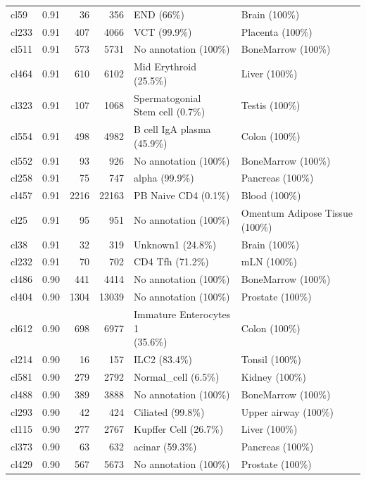 \begin{table}[ht!]
\begin{tabular}{lrrrll}
  cl59 & 0.91 &  36 & 356 & END (66\%) & Brain (100\%) \\ 
  cl233 & 0.91 & 407 & 4066 & VCT (99.9\%) & Placenta (100\%) \\ 
  cl511 & 0.91 & 573 & 5731 & No annotation (100\%) & BoneMarrow (100\%) \\ 
  cl464 & 0.91 & 610 & 6102 & Mid Erythroid (25.5\%) & Liver (100\%) \\ 
  cl323 & 0.91 & 107 & 1068 & \specialcell[t]{Spermatogonial\\Stem cell (0.7\%)} & Testis (100\%) \\ 
  cl554 & 0.91 & 498 & 4982 & B cell IgA plasma (45.9\%) & Colon (100\%) \\ 
  cl552 & 0.91 &  93 & 926 & No annotation (100\%) & BoneMarrow (100\%) \\ 
  cl258 & 0.91 &  75 & 747 & alpha (99.9\%) & Pancreas (100\%) \\ 
  cl457 & 0.91 & 2216 & 22163 & PB Naive CD4  (0.1\%) & Blood (100\%) \\ 
  cl25 & 0.91 &  95 & 951 & No annotation (100\%) & Omentum Adipose Tissue (100\%) \\ 
  cl38 & 0.91 &  32 & 319 & Unknown1 (24.8\%) & Brain (100\%) \\ 
  cl232 & 0.91 &  70 & 702 & CD4 Tfh (71.2\%) & mLN (100\%) \\ 
  cl486 & 0.90 & 441 & 4414 & No annotation (100\%) & BoneMarrow (100\%) \\ 
  cl404 & 0.90 & 1304 & 13039 & No annotation (100\%) & Prostate (100\%) \\ 
  cl612 & 0.90 & 698 & 6977 & \specialcell[t]{Immature Enterocytes 1\\(35.6\%)} & Colon (100\%) \\ 
  cl214 & 0.90 &  16 & 157 & ILC2 (83.4\%) & Tonsil (100\%) \\ 
  cl581 & 0.90 & 279 & 2792 & Normal\_cell (6.5\%) & Kidney (100\%) \\ 
  cl488 & 0.90 & 389 & 3888 & No annotation (100\%) & BoneMarrow (100\%) \\ 
  cl293 & 0.90 &  42 & 424 & Ciliated (99.8\%) & Upper airway (100\%) \\ 
  cl115 & 0.90 & 277 & 2767 & Kupffer Cell (26.7\%) & Liver (100\%) \\ 
  cl373 & 0.90 &  63 & 632 & acinar (59.3\%) & Pancreas (100\%) \\ 
  cl429 & 0.90 & 567 & 5673 & No annotation (100\%) & Prostate (100\%) \\ 

\end{tabular}
\end{table}
